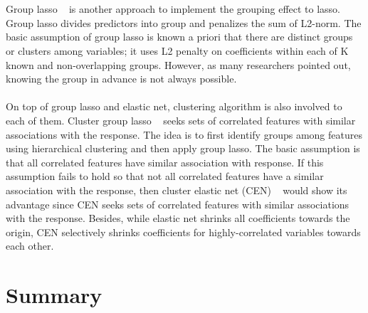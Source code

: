\documentclass[11pt]{article}
\begin{document}
\\ \\
Group lasso ~\cite{Francis2008Con} is another approach to implement the grouping effect to lasso. Group lasso divides predictors into group and penalizes the sum of L2-norm. The basic assumption of group lasso is known a priori that there are distinct groups or clusters among variables; it uses L2 penalty on coefficients within each of K known and non-overlapping groups. However, as many researchers pointed out, knowing the group in advance is not always possible.
\\ \\
On top of group lasso and elastic net, clustering algorithm is also involved to each of them. Cluster group lasso ~\cite{Peter2013Cor} seeks sets of correlated features with similar associations with the response. The idea is to first identify groups among features using hierarchical clustering and then apply group lasso. The basic assumption is that all correlated features have similar association with response. If this assumption fails to hold so that not all correlated features have a similar association with the response, then cluster elastic net (CEN) ~\cite{Dan2014The} would show its advantage since CEN seeks sets of correlated features with similar associations with the response. Besides, while elastic net shrinks all coefficients towards the origin, CEN selectively shrinks coefficients for highly-correlated variables towards each other. 

\section{Summary}

{}

\end{document}
